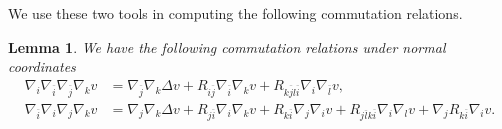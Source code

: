 \documentclass[12pt]{article}
\newtheorem{lemma}[theorem]{Lemma}
\numberwithin{equation}{section}
\newcommand{\oo}[1]{\overline{#1}}
\begin{document}
\noindent We use these two tools in computing the following commutation relations.

\begin{lemma}\label{commutation_relations}
We have the following commutation relations under normal coordinates
\begin{align*}
    \nabla_i \nabla_{\oo{i}} \nabla_{\oo{j}} \nabla_k v &= \nabla_{\oo{j}} \nabla_k \Delta v + R_{i \oo{j}} \nabla_{\oo{i}} \nabla_k v + R_{k\oo{j}l\oo{i}} \nabla_i \nabla_{\oo{l}} v,\\
    \nabla_{\oo{i}} \nabla_i \nabla_j \nabla_k v &= \nabla_j \nabla_k \Delta v + R_{j \oo{i}} \nabla_i \nabla_{k} v + R_{k\oo{i}}\nabla_j\nabla_{i} v + R_{j\oo{l}k\oo{i}} \nabla_i \nabla_l v +\nabla_j R_{k \oo{i}} \nabla_i v.
\end{align*}
\end{lemma}
\end{document}
